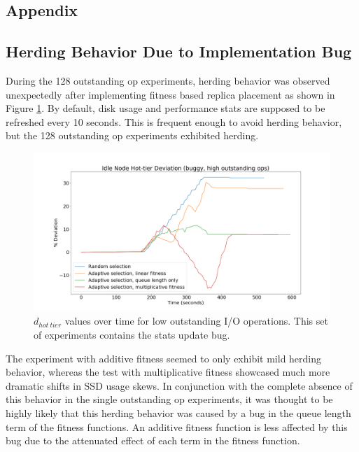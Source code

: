 \documentclass[12pt]{article}
\begin{document}
\newpage
\FloatBarrier
\begin{appendices}
\appendix
\section{Appendix}

  \subsection{Herding Behavior Due to Implementation Bug}

  During the 128 outstanding op experiments, herding behavior
  was observed unexpectedly after implementing fitness based replica placement
  as shown in Figure \ref{fig:herding_bug}. By default, disk usage and
  performance stats are supposed to be refreshed every 10 seconds. This is
  frequent enough to avoid herding behavior, but the 128 outstanding op
  experiments exhibited herding.

  \begin{figure}[htbp]
    \centering
    \includegraphics[scale=0.30]{images/buggy.png} 
    \caption{$d_{hot\ tier}$ values over time for low outstanding I/O
             operations. This set of experiments contains the stats update bug.}
    \label{fig:herding_bug}
  \end{figure}

  The experiment with additive fitness seemed to only exhibit mild herding
  behavior, whereas the test with multiplicative fitness showcased much more
  dramatic shifts in SSD usage skews. In conjunction with the complete absence
  of this behavior in the single outstanding op experiments, it was thought to
  be highly likely that this herding behavior was caused by a bug in the queue
  length term of the fitness functions. An additive fitness function is less
  affected by this bug due to the attenuated effect of each term in the fitness
  function.


\end{appendices}
\end{document}
